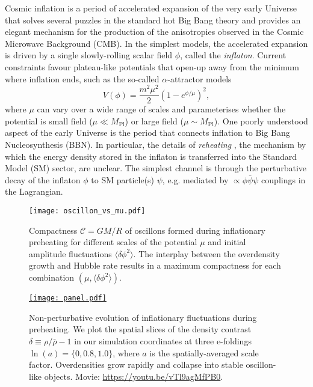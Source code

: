 \documentclass[
    reprint,
    preprintnumbers,
    superscriptaddress,
    nofootinbib,
     amsmath,amssymb,
     aps,
     prd,
    floatfix,
    ]{revtex4-2}
\newcommand{\mpl}{M_\mathrm{Pl}}
\begin{document}
Cosmic inflation \cite{Guth:1980zm,Starobinsky:1980te,Linde:1981mu,Albrecht:1982wi} is a period of accelerated expansion of the very early Universe that solves several puzzles in the standard hot Big Bang theory and provides an elegant mechanism for the production of the anisotropies observed in the Cosmic Microwave Background (CMB)\cite{Planck:2018vyg}. In the simplest models, the accelerated expansion is driven by a single slowly-rolling scalar field $\phi$, called the \textit{inflaton}. Current constraints \cite{Planck:2018jri} favour plateau-like potentials that open-up away from the minimum where inflation ends, such as the so-called $\alpha$-attractor models \cite{Kallosh:2013hoa,Kallosh:2013yoa}
\begin{equation}\label{eq:potential}
V(\phi) = \frac{m^2 \mu^2}{2} \left(1 - e^{\phi/\mu} \right)^2 ,
\end{equation}
where $\mu$ can vary over a wide range of scales and parameterises whether the potential is small field ($\mu \ll \mpl $) or large field ($\mu \sim \mpl $).
One poorly understood aspect of the early Universe is the period that connects inflation to Big Bang Nucleosynthesis (BBN). In particular, the details of \textit{reheating} \cite{Kofman:1994rk, Kofman:1997yn,Albrecht:1982mp}, the mechanism by which the energy density stored in the inflaton is transferred into the Standard Model (SM) sector, are unclear. The simplest channel is through the perturbative decay of the inflaton $\phi$ to SM particle(s) $\psi$, e.g. mediated by $\propto \phi \bar\psi \psi$ couplings in the Lagrangian.

\begin{figure}[t!]
    \centering
    \texttt{[image: oscillon\_vs\_mu.pdf]}
\caption{Compactness $\mathcal{C}=G M/R$ of oscillons formed during inflationary preheating for different scales of the potential $\mu$ and initial amplitude fluctuations $\langle\delta\phi^2\rangle$.
The interplay between the overdensity growth and Hubble rate results in a maximum compactness for each combination $(\mu,\langle \delta\phi^2 \rangle)$.}
\label{fig:oscillon}
\end{figure}
\begin{figure*}[t!]
    \centering
    \href{https://youtu.be/vTl9agMfPB0}{
    \texttt{[image: panel.pdf]}}
\caption{Non-perturbative evolution of inflationary fluctuations during preheating. We plot the spatial slices of the density contrast $\delta\equiv \rho/\bar{\rho} - 1$ in our simulation coordinates at three e-foldings $\ln(a) = \lbrace 0, 0.8, 1.0\rbrace$, where $a$ is the spatially-averaged scale factor. Overdensities grow rapidly and collapse into stable oscillon-like objects. Movie: \url{https://youtu.be/vTl9agMfPB0}.} 
\label{fig:panel}
\end{figure*}
\end{document}
